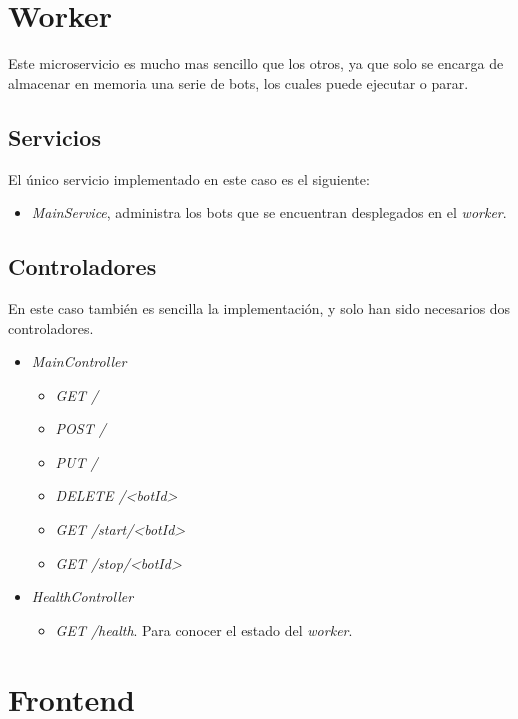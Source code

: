 \section{Worker}

Este microservicio es mucho mas sencillo que los otros, ya que solo se encarga de almacenar en memoria una serie de bots, los cuales puede ejecutar o parar.

\subsection{Servicios}

El único servicio implementado en este caso es el siguiente:

\begin{itemize}
	\item \textit{MainService}, administra los bots que se encuentran desplegados en el \textit{worker}.
\end{itemize}

\subsection{Controladores}

En este caso también es sencilla la implementación, y solo han sido necesarios dos controladores.

\begin{itemize}
	\item \textit{MainController}
	\begin{itemize}
		\item \textit{GET /}
		\item \textit{POST /}
		\item \textit{PUT /}
		\item \textit{DELETE /<botId>}
		\item \textit{GET /start/<botId>}
		\item \textit{GET /stop/<botId>}
	\end{itemize}
	\item \textit{HealthController}
	\begin{itemize}
		\item \textit{GET /health}. Para conocer el estado del \textit{worker}.
	\end{itemize}
\end{itemize}





\section{Frontend}

